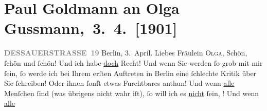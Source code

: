 

         
         \renewcommand{\erwaehntePersonen}{Personen: Bjørnstjerne Bjørnson, Marie Glümer, Paul Goldmann, Olga Schnitzler, Elisabeth Steinrück, Ernst von Wolzogen}
         \renewcommand{\erwaehnteInstitutionen}{Institutionen: Überbrettl}
         \renewcommand{\erwaehnteOrte}{Orte: ?? [Sanatorium], Berlin, Dessauer Straße, Wien}
         \renewcommand{\erwaehnteWerke}{Werke: Berliner Theater. [Über unsere Kraft, zweiter Teil von Bjørnstjerne Bjørnson], Neue Freie Presse, Über unsere Kraft. Zweiter Teil}
               \section[ Paul Goldmann an Olga Gussmann, 3. 4. {[}1901{]}]{ Paul Goldmann an Olga Gussmann, 3. 4. {[}1901{]}}\nopagebreak{}\rehead{ }\begin{ledgroupsized}[t]{13cm}\normalsize\beginnumbering{} \toendnotes[C]{\smallbreak\pagebreak[2]} 
\toendnotes[C]{\smallbreak}\pstart
           \noindent{}\raggedleft{}{\pb}\textcolor{gray}{\textbf{DESSAUERSTRASSE 19}}\pend
           \pstart
           Berlin, 3. April.\pend
           \pstart\center{}Liebes Fräulein \textsc{Olga},\pend\pstart
           Schön, ſchön und ſchön! Und ich habe \uline{doch} Recht! Und
               wenn Sie werden ſo grob mit mir ſein, ſo werde ich bei Ihrem erſten Auftreten in Berlin eine ſchlechte Kritik über Sie ſchreiben!
               Oder ihnen ſonſt etwas Furchtbares anthun! Und wenn \uline{alle} Menſchen \label{K_L03525-1v}\label{K_L03525-1h} ſind (was übrigens nicht wahr iſt), ſo will ich es \uline{nicht} ſein, \label{K_L03525-2v}\label{K_L03525-2h}! Und wenn \uline{alle}

\end{ledgroupsized}
